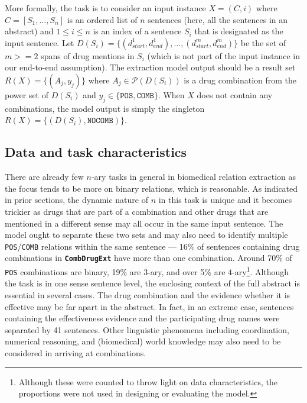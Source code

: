 \documentclass[conference]{IEEEtran}
\begin{document}
More formally, the task is to consider an input instance $X=(C, i)$  where $C=[S_1,\ldots,S_n]$ is an ordered list of $n$ sentences (here, all the sentences in an abstract) and $1 \leq i \leq n$ is an index of a  sentence $S_i$ that is designated as the input sentence.
Let  $D (S_i) =\{(d^1_{start}, d^1_{end}), \ldots, (d^m_{start}, d^m_{end})\}$ be the set of $m>=2$ spans of drug mentions in $S_i$ (which is not part of the input instance in our end-to-end assumption). The extraction model  output should  be a result  set $R(X) =\{(A_j, y_j)\}$ where $A_j \in \mathcal{P}(D(S_i))$ is a drug combination from the power set of $D(S_i)$  and $y_j \in \{ \texttt{POS}, \texttt{COMB}\}$. When $X$ does not contain any combinations, the model output is simply the singleton $R(X) = \{ (D(S_i), \texttt{NOCOMB})\}$.


\subsection{Data and task characteristics} \label{challenges}
There are already few $n$-ary tasks in general in biomedical relation extraction as the focus tends to be more on binary relations, which is reasonable. As indicated in prior sections, the dynamic nature of $n$ in this task is unique and it becomes trickier as drugs that are part of a combination and other drugs that are mentioned in a different sense may all occur in the same input sentence. The model ought to separate these two sets and may also need to identify multiple \texttt{POS}/\texttt{COMB} relations within the same sentence --- 16\% of sentences containing drug combinations in \textbf{\texttt{CombDrugExt}}  have more than one combination.  Around 70\% of \texttt{POS} combinations are binary, 19\% are $3$-ary, and over 5\% are $4$-ary\footnote{Although these were counted to throw light on data characteristics, the proportions were not used in designing or evaluating the model.}. Although the task is in one sense sentence level, the enclosing context of the full abstract is essential in several cases. The drug combination and the evidence whether it is effective may be far apart in the abstract. In fact, in an extreme case, sentences containing the effectiveness evidence and the participating drug names were separated by 41 sentences. Other linguistic phenomena including coordination, numerical reasoning, and (biomedical) world knowledge may also need to be considered in arriving at combinations.
\end{document}
